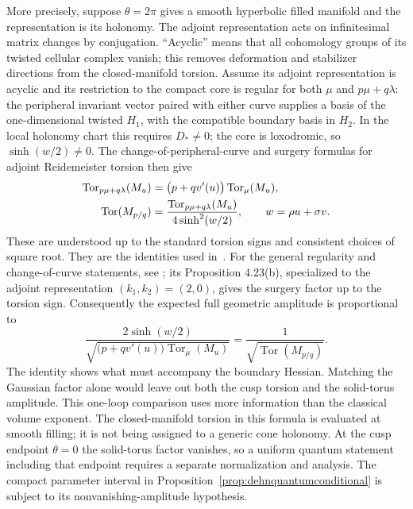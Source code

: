 More precisely, suppose $\theta=2\pi$ gives a smooth hyperbolic filled
manifold and the representation is its holonomy. The adjoint representation acts on infinitesimal matrix changes
by conjugation. ``Acyclic'' means that all cohomology groups of
its twisted cellular complex vanish; this removes deformation
and stabilizer directions from the closed-manifold torsion.
Assume its adjoint representation is acyclic and its restriction to the compact core is
regular for both $\mu$ and $p\mu+q\lambda$: the peripheral invariant
vector paired with either curve supplies a basis of the one-dimensional
twisted $H_1$, with the compatible boundary basis in $H_2$.
In the local holonomy chart this requires $D_*\ne0$; the core is
loxodromic, so $\sinh(w/2)\ne0$. The change-of-peripheral-curve
and surgery formulas for adjoint Reidemeister torsion then give
\begin{align}
 \operatorname{Tor}_{p\mu+q\lambda}(M_u)
   &=\bigl(p+qv'(u)\bigr)\operatorname{Tor}_\mu(M_u),\notag\\
 \operatorname{Tor}(M_{p/q})
   &=\frac{\operatorname{Tor}_{p\mu+q\lambda}(M_u)}
               {4\sinh^2(w/2)},\qquad
 w=\rho u+\sigma v.
 \label{eq:dehntorsionsurgery}
\end{align}
These are understood up to the standard torsion signs and
consistent choices of square root. They are the identities
used in~\cite[equations (5.16) and (5.23)]{WongYangDehn}.
For the general regularity and change-of-curve statements, see
\cite[Propositions 5.13--5.14]{PortiTorsionSurvey}; its
Proposition 4.23(b), specialized to the adjoint representation
$(k_1,k_2)=(2,0)$, gives the surgery factor up to the torsion sign.
Consequently the expected full geometric amplitude is proportional to
\begin{equation}
 \boxed{
 \frac{2\sinh(w/2)}
      {\sqrt{\bigl(p+qv'(u)\bigr)\operatorname{Tor}_\mu(M_u)}}
       =\frac{1}{\sqrt{\operatorname{Tor}(M_{p/q})}}.}
 \label{eq:dehngaussiantorsion}
\end{equation}
The identity shows what must accompany the boundary Hessian.
Matching the Gaussian factor alone would leave out both the cusp
torsion and the solid-torus amplitude. This one-loop comparison
uses more information than the classical volume exponent.
The closed-manifold torsion in this formula is evaluated at smooth
filling; it is not being assigned to a generic cone holonomy.
At the cusp endpoint $\theta=0$ the solid-torus factor vanishes,
so a uniform quantum statement including that endpoint requires
a separate normalization and analysis. The compact parameter
interval in Proposition~\ref{prop:dehnquantumconditional} is
subject to its nonvanishing-amplitude hypothesis.


